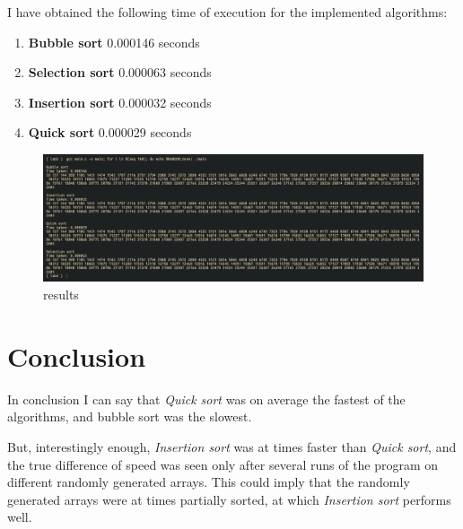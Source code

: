 \documentclass[12pt]{article}
\begin{document}
I have obtained the following time of execution for the implemented algorithms:
\begin{enumerate}
    \item \textbf{Bubble sort} 0.000146 seconds
    \item \textbf{Selection sort} 0.000063 seconds
    \item \textbf{Insertion sort} 0.000032 seconds
    \item \textbf{Quick sort} 0.000029 seconds
\end{enumerate}

\begin{figure}[!h]
  \centering
  \includegraphics[width=\textwidth]{results.png}
  \caption{results}
\end{figure}


\section*{Conclusion}
\hspace{0.8cm}
In conclusion I can say that \textit{Quick sort} was on average the fastest of the algorithms, and bubble sort was the slowest.

But, interestingly enough, \textit{Insertion sort} was at times faster than \textit{Quick sort}, and the true difference of speed was seen only after several runs of the program  on different randomly generated arrays. This could imply that the randomly generated arrays were at times partially sorted, at which \textit{Insertion sort} performs well.\cite{etc}

\printbibliography
\end{document}
